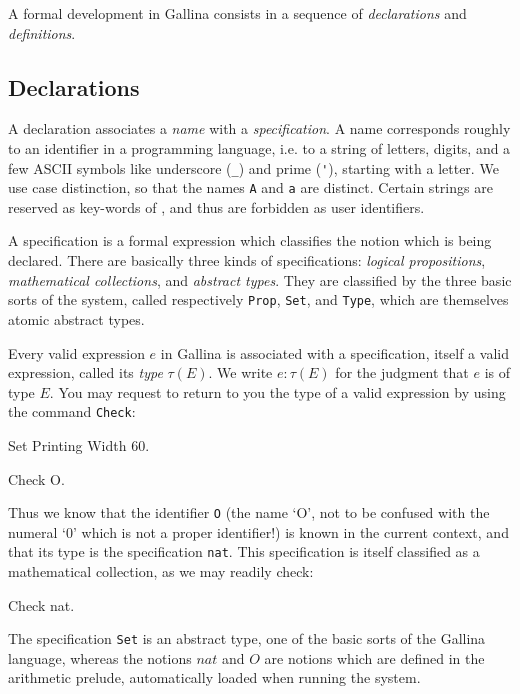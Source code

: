\documentclass[11pt,a4paper]{book}
\begin{document}
A formal development in Gallina consists in a sequence of {\sl declarations}
and {\sl definitions}.

\subsection{Declarations}

A declaration associates a {\sl name} with a {\sl specification}.
A name corresponds roughly to an identifier in a programming
language, i.e. to a string of letters, digits, and a few ASCII symbols like
underscore (\verb"_") and prime (\verb"'"), starting with a letter. 
We use case distinction, so that the names \verb"A" and \verb"a" are distinct.
Certain strings are reserved as key-words of \Coq, and thus are forbidden 
as user identifiers.

A specification is a formal expression which classifies the notion which is
being declared. There are basically three kinds of specifications: 
{\sl logical propositions}, {\sl mathematical collections}, and
{\sl abstract types}. They are classified by the three basic sorts
of the system, called respectively \verb:Prop:, \verb:Set:, and
\verb:Type:, which are themselves atomic abstract types.

Every valid expression $e$ in Gallina is associated with a specification,
itself a valid expression, called its {\sl type} $\tau(E)$. We write
$e:\tau(E)$ for the judgment that $e$ is of type $E$. 
You may request \Coq{} to return to you the type of a valid expression by using
the command \verb:Check::

\begin{coq_eval}
Set Printing Width 60.
\end{coq_eval}

\begin{coq_example}
Check O.
\end{coq_example}

Thus we know that the identifier \verb:O: (the name `O', not to be
confused with the numeral `0' which is not a proper identifier!) is
known in the current context, and that its type is the specification 
\verb:nat:. This specification is itself classified as a mathematical
collection, as we may readily check:

\begin{coq_example}
Check nat.
\end{coq_example}

The specification \verb:Set: is an abstract type, one of the basic
sorts of the Gallina language, whereas the notions $nat$ and $O$ are
notions which are defined in the arithmetic prelude,
automatically loaded when running the \Coq{} system.
\end{document}
